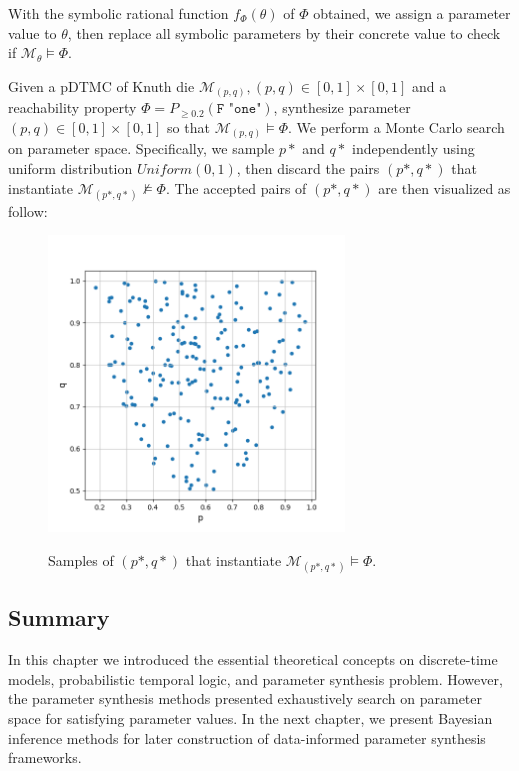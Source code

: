 With the symbolic rational function $f_\Phi(\theta)$ of $\Phi$ obtained, we assign a parameter value
to $\theta$, then replace all symbolic parameters by their concrete value to check if
$\mathcal{M}_\theta \models \Phi$.
\begin{example}
      Given a pDTMC of Knuth die $\mathcal{M}_{(p,q)}, (p,q)\in[0,1]\times[0,1]$ and a reachability
      property $\Phi = P_{\geq 0.2} (\texttt{F "one"})$, synthesize parameter
      $(p,q)\in[0,1]\times[0,1]$ so that $\mathcal{M}_{(p,q)} \models \Phi$. We perform a Monte
      Carlo search on parameter space. Specifically, we sample $p*$ and $q*$ independently using
      uniform distribution $Uniform(0,1)$, then discard the pairs $(p*,q*)$ that instantiate
      $\mathcal{M}_{(p*,q*)}\nvDash \Phi$. The accepted pairs of $(p*,q*)$ are then visualized as follow:
      \begin{figure}[H]
            \centering
            \includegraphics[width=0.7\textwidth]{figures/knuth_die_trueparams.png}
            \label{fig:knuth-die-pq-trueparams}
            \caption{Samples of $(p*,q*)$ that instantiate $\mathcal{M}_{(p*,q*)} \models \Phi$.}
      \end{figure}
\end{example}

\subsection{Summary}
In this chapter we introduced the essential theoretical concepts on discrete-time models,
probabilistic temporal logic, and parameter synthesis problem. However, the parameter synthesis
methods presented exhaustively search on parameter space for satisfying parameter values. In the
next chapter, we present Bayesian inference methods for later construction of data-informed
parameter synthesis frameworks.